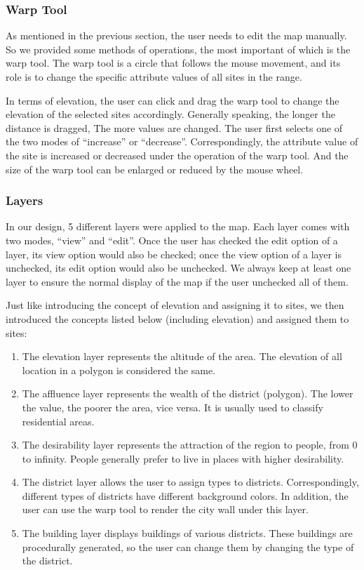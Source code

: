 \subsubsection{Warp Tool}
As mentioned in the previous section, the user needs to edit the map manually. So we provided some methods of operations, the most important of which is the warp tool. The warp tool is a circle that follows the mouse movement, and its role is to change the specific attribute values of all sites in the range.

In terms of elevation, the user can click and drag the warp tool to change the elevation of the selected sites accordingly. Generally speaking, the longer the distance is dragged, The more values are changed. The user first selects one of the two modes of ``increase'' or ``decrease''. Correspondingly, the attribute value of the site is increased or decreased under the operation of the warp tool. And the size of the warp tool can be enlarged or reduced by the mouse wheel.

\subsubsection{Layers}
In our design, 5 different layers were applied to the map. Each layer comes with two modes, ``view'' and ``edit''. Once the user has checked the edit option of a layer, its view option would also be checked; once the view option of a layer is unchecked, its edit option would also be unchecked. We always keep at least one layer to ensure the normal display of the map if the user unchecked all of them.

Just like introducing the concept of elevation and assigning it to sites, we then introduced the concepts listed below (including elevation) and assigned them to sites:

\begin{enumerate}
  \item The elevation layer represents the altitude of the area. The elevation of all location in a polygon is considered the same.
  \item The affluence layer represents the wealth of the district (polygon). The lower the value, the poorer the area, vice versa. It is usually used to classify residential areas.
  \item The desirability layer represents the attraction of the region to people, from 0 to infinity. People generally prefer to live in places with higher desirability.
  \item The district layer allows the user to assign types to districts. Correspondingly, different types of districts have different background colors. In addition, the user can use the warp tool to render the city wall under this layer.
  \item The building layer displays buildings of various districts. These buildings are procedurally generated, so the user can change them by changing the type of the district.
\end{enumerate}

